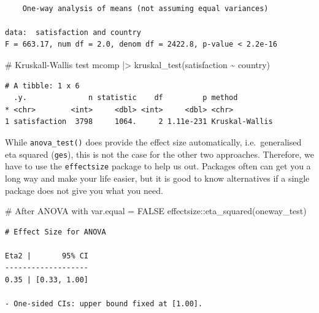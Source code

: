 \documentclass[
  letterpaper,
]{krantz}
\makeatletter
\newenvironment{Shaded}{\begin{snugshade}}{\end{snugshade}}
\newcommand{\CommentTok}[1]{\textcolor[rgb]{0.37,0.37,0.37}{#1}}
\newcommand{\FunctionTok}[1]{\textcolor[rgb]{0.28,0.35,0.67}{#1}}
\newcommand{\NormalTok}[1]{\textcolor[rgb]{0.00,0.23,0.31}{#1}}
\newcommand{\SpecialCharTok}[1]{\textcolor[rgb]{0.37,0.37,0.37}{#1}}
\newenvironment{kframe}{%
\medskip{}
\setlength{\fboxsep}{.8em}
 \def\at@end@of@kframe{}%
 \ifinner\ifhmode%
  \def\at@end@of@kframe{\end{minipage}}%
  \begin{minipage}{\columnwidth}%
 \fi\fi%
 \def\FrameCommand##1{\hskip\@totalleftmargin \hskip-\fboxsep
 \colorbox{shadecolor}{##1}\hskip-\fboxsep
     \hskip-\linewidth \hskip-\@totalleftmargin \hskip\columnwidth}%
 \MakeFramed {\advance\hsize-\width
   \@totalleftmargin\z@ \linewidth\hsize
   \@setminipage}}%
 {\par\unskip\endMakeFramed%
 \at@end@of@kframe}
\renewenvironment{Shaded}{\begin{kframe}}{\end{kframe}}
\makeatother
\begin{document}
\begin{verbatim}

    One-way analysis of means (not assuming equal variances)

data:  satisfaction and country
F = 663.17, num df = 2.0, denom df = 2422.8, p-value < 2.2e-16
\end{verbatim}

\begin{Shaded}
\begin{Highlighting}[]
\CommentTok{\# Kruskall{-}Wallis test}
\NormalTok{mcomp }\SpecialCharTok{|\textgreater{}} \FunctionTok{kruskal\_test}\NormalTok{(satisfaction }\SpecialCharTok{\textasciitilde{}}\NormalTok{ country)}
\end{Highlighting}
\end{Shaded}

\begin{verbatim}
# A tibble: 1 x 6
  .y.              n statistic    df         p method        
* <chr>        <int>     <dbl> <int>     <dbl> <chr>         
1 satisfaction  3798     1064.     2 1.11e-231 Kruskal-Wallis
\end{verbatim}

While \texttt{anova\_test()} does provide the effect size automatically,
i.e.~generalised eta squared (\texttt{ges}), this is not the case for
the other two approaches. Therefore, we have to use the
\texttt{effectsize} package to help us out. Packages often can get you a
long way and make your life easier, but it is good to know alternatives
if a single package does not give you what you need.

\begin{Shaded}
\begin{Highlighting}[]
\CommentTok{\# After ANOVA with var.equal = FALSE}
\NormalTok{effectsize}\SpecialCharTok{::}\FunctionTok{eta\_squared}\NormalTok{(oneway\_test)}
\end{Highlighting}
\end{Shaded}

\begin{verbatim}
# Effect Size for ANOVA

Eta2 |       95% CI
-------------------
0.35 | [0.33, 1.00]

- One-sided CIs: upper bound fixed at [1.00].
\end{verbatim}

\begin{Shaded}
\end{Shaded}
\end{document}
